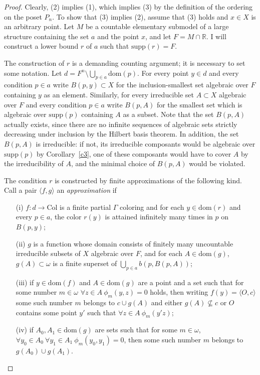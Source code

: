 \documentclass{article}
\newcommand{\gw}{\omega}
\newcommand{\supp}{\mathrm{supp}}
\newcommand{\dom}{\mathrm{dom}}
\newcommand{\colors}{\mathrm{Col}}
\theoremstyle{definition}
\begin{document}
\begin{proof}
Clearly, (2) implies (1), which implies (3) by the definition of the ordering on the poset $P_n$. To show that (3) implies (2), assume that (3) holds and $x\in X$ is an arbitrary point. Let $M$ be a countable elementary submodel of a large structure containing the set $a$ and the point $x$, and let $F=M\cap\mathbb{R}$. I will construct a lower bound $r$ of $a$ such that $\supp(r)=F$.

The construction of $r$ is a demanding counting argument; it is necessary to set some notation. Let $d=F^n\setminus\bigcup_{p\in a}\dom(p)$. For every point $y\in d$ and every condition $p\in a$ write $B(p, y)\subset X$ for the inclusion-smallest set algebraic over $F$ containing $y$ as an element. Similarly, for every irreducible set $A\subset X$ algebraic over $F$ and every condition $p\in a$ write $B(p, A)$ for the smallest set which is algebraic over $\supp(p)$ containing $A$ as a subset. Note that the set $B(p, A)$ actually exists, since there are no infinite sequences of algebraic sets strictly decreasing under inclusion by the Hilbert basis theorem.  In addition, the set $B(p, A)$ is irreducible: if not, its irreducible composants would be algebraic over $\supp(p)$ by Corollary~\ref{c3}, one of these composants would have to cover $A$ by the irreducibility of $A$, and the minimal choice of $B(p, A)$ would be violated.

The condition $r$ is constructed by finite approximations of the following kind. Call a pair $\langle f, g\rangle$ an \emph{approximation} if 

\begin{itemize}
\item[(i)] $f\colon d\to\colors$ is a finite partial $\Gamma$ coloring and for each $y\in\dom(r)$ and every $p\in a$, the color $r(y)$ is attained infinitely many times in $p$ on $B(p, y)$;
\item[(ii)] $g$ is a function whose domain consists of finitely many uncountable irreducible subsets of $X$ algebraic over $F$, and for each $A\in\dom(g)$, $g(A)\subset\gw$ is a finite superset of $\bigcup_{p\in a}b(p, B(p, A))$;
\item[(iii)] if $y\in\dom(f)$ and $A\in\dom(g)$ are a point and a set such that for some number $m\in\gw$ $\forall z\in A\ \phi_m(y, z)=0$ holds, then writing $f(y)=\langle O, c\rangle$ some such number $m$ belongs to $c\cup g(A)$ and either $g(A)\not\subseteq c$ or $O$ contains some point $y'$ such that $\forall z\in A\ \phi_m(y' z)$;
\item[(iv)] if $A_0, A_1\in\dom(g)$ are sets such that for some $m\in\gw$, $\forall y_0\in A_0\ \forall y_1\in A_1\ \phi_m(y_0, y_1)=0$, then some such number $m$ belongs to $g(A_0)\cup g(A_1)$.
\end{itemize}


\end{proof}
\end{document}
